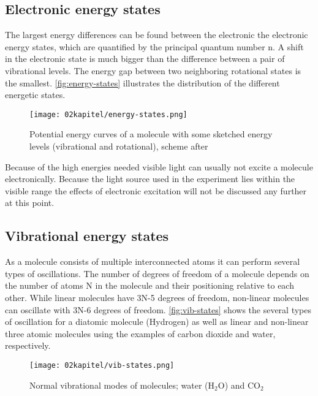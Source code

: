 \subsection{Electronic energy states}

The largest energy differences can be found between the electronic the electronic energy states, which are quantified by the principal quantum number n. A shift in the electronic state is much bigger than the difference between a pair of vibrational levels. The energy gap between two neighboring rotational states is the smallest. \autoref{fig:energy-states} illustrates the distribution of the different energetic states.

\begin{figure}[!htb]
    \centering
    \texttt{[image: 02kapitel/energy-states.png]}
    \caption[Potential energy curves with some energy levels]{Potential energy curves of a molecule with some sketched energy levels (vibrational and rotational), scheme after \autocite{brauerApplicationRamanSpectroscopy2022}}
    \label{fig:energy-states}
\end{figure}

Because of the high energies needed visible light can usually not excite a molecule electronically. Because the light source used in the experiment lies within the visible range the effects of electronic excitation will not be discussed any further at this point.

\subsection{Vibrational energy states}

As a molecule consists of multiple interconnected atoms it can perform several types of oscillations. The number of degrees of freedom of a molecule depends on the number of atoms N in the molecule and their positioning relative to each other. While linear molecules have 3N-5 degrees of freedom, non-linear molecules can oscillate with 3N-6 degrees of freedom. \autoref{fig:vib-states} shows the several types of oscillation for a diatomic molecule (Hydrogen) as well as linear and non-linear three atomic molecules using the examples of carbon dioxide and water, respectively.

\begin{figure}[!htb]
    \centering
    \texttt{[image: 02kapitel/vib-states.png]}
    \caption[Normal modes of selected molecules]{Normal vibrational modes of molecules; water ($\mathrm{H_2O}$) and $\mathrm{CO_2}$ \autocite{brauerApplicationRamanSpectroscopy2022}}
    \label{fig:vib-states}
\end{figure}


